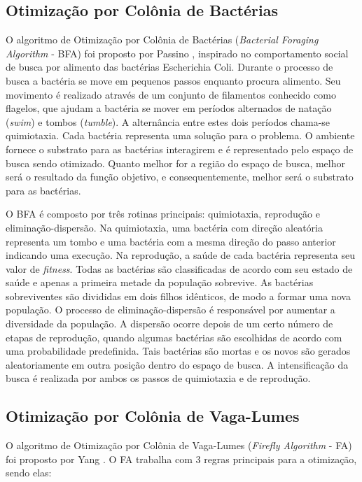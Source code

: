 \subsection{Otimização por Colônia de Bactérias}
\label{sec:biomimicry_bacterial_foraging}
O algoritmo de Otimização por Colônia de Bactérias (\textit{Bacterial Foraging Algorithm} - BFA) foi proposto por Passino \cite{passino2002biomimicry}, inspirado no comportamento social de busca por alimento das bactérias Escherichia Coli. Durante o processo de busca a bactéria se move em pequenos passos enquanto procura alimento. Seu movimento é realizado através de um conjunto de filamentos conhecido como flagelos, que ajudam a bactéria se mover em períodos alternados de natação (\textit{swim}) e tombos (\textit{tumble}). A alternância entre estes dois períodos chama-se quimiotaxia. Cada bactéria representa uma solução para o problema. O ambiente fornece o substrato para as bactérias interagirem e é representado pelo espaço de busca sendo otimizado. Quanto melhor for a região do espaço de busca, melhor será o resultado da função objetivo, e consequentemente, melhor será o substrato para as bactérias.

O BFA é composto por três rotinas principais: quimiotaxia, reprodução e eliminação-dispersão. Na quimiotaxia, uma bactéria com direção aleatória representa um tombo e uma bactéria com a mesma direção do passo anterior indicando uma execução. Na reprodução, a saúde de cada bactéria representa seu valor de \textit{fitness}. Todas as bactérias são classificadas de acordo com seu estado de saúde e apenas a primeira metade da população sobrevive. As bactérias sobreviventes são divididas em dois filhos idênticos, de modo a formar uma nova população. O processo de eliminação-dispersão é responsável por aumentar a diversidade da população. A dispersão ocorre depois de um certo número de etapas de reprodução, quando algumas bactérias são escolhidas de acordo com uma probabilidade predefinida. Tais bactérias são mortas e os novos são gerados aleatoriamente em outra posição dentro do espaço de busca. A intensificação da busca é realizada por ambos os passos de quimiotaxia e de reprodução.

\subsection{Otimização por Colônia de Vaga-Lumes}
\label{sec:firefly_algorithm}
O algoritmo de Otimização por Colônia de Vaga-Lumes (\textit{Firefly Algorithm} - FA) foi proposto por Yang \cite{firefly}. O FA trabalha com 3 regras principais para a otimização, sendo elas:

